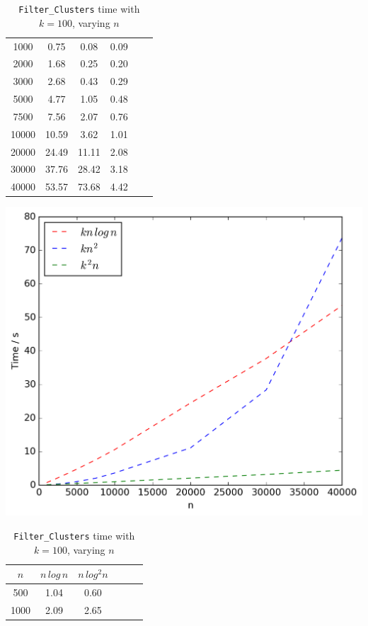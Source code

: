 \documentclass{article}
\begin{document}
\begin{table}[!ht]
\begin{minipage}{0.48\textwidth}
\begin{tabular}{c||ccccc}
                \hline\hline
                1000 & 0.75 & 0.08 & 0.09\\
                2000 & 1.68 & 0.25 & 0.20\\
                3000 & 2.68 & 0.43 & 0.29\\
                5000 & 4.77 & 1.05 & 0.48\\
                7500 & 7.56 & 2.07 & 0.76\\
                10000 & 10.59 & 3.62 & 1.01\\
                20000 & 24.49 & 11.11 & 2.08\\
                30000 & 37.76 & 28.42 & 3.18\\
                40000 & 53.57 & 73.68 & 4.42\\
            \end{tabular}
            \includegraphics[scale=0.4]{varyingn2_weighting}
        \end{minipage}\hfill
        \begin{minipage}{0.48\textwidth}
            \centering
            \caption{\texttt{Filter\_Clusters} time with $k = 100$, varying $n$}
            \label{tab:filtern2}
            \begin{tabular}{c||ccccc}
                $n$ & $n\,log\,n$ & $n\,log^2n$\\
                \hline\hline
                500 & 1.04 & 0.60\\
                1000 & 2.09 & 2.65\\

\end{tabular}
\end{minipage}
\end{table}
\end{document}
